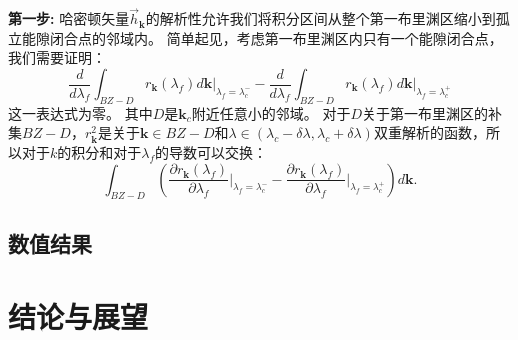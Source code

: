 			{\bf 第一步:}
			哈密顿矢量${\vec{h}}_{\mathbf{k}}$的解析性允许我们将积分区间从整个第一布里渊区缩小到孤立能隙闭合点的邻域内。
			简单起见，考虑第一布里渊区内只有一个能隙闭合点，我们需要证明：
			\begin{equation}
				\frac{d}{d\lambda_f} \int_{BZ-D} r_\mathbf{k}(\lambda_f) d\mathbf{k} \bigg|_{\lambda_f=\lambda_c^-} - \frac{d}{d\lambda_f} \int_{BZ-D} r_\mathbf{k}(\lambda_f) d\mathbf{k} \bigg|_{\lambda_f=\lambda_c^+}
			\end{equation}
			这一表达式为零。
			其中$D$是$\mathbf{k}_c$附近任意小的邻域。
			对于$D$关于第一布里渊区的补集$BZ-D$，$r_\mathbf{k}^2$是关于$\mathbf{k} \in BZ-D$和$\lambda \in (\lambda_c-\delta \lambda, \lambda_c+\delta \lambda)$双重解析的函数，所以对于$k$的积分和对于$\lambda_f$的导数可以交换：
			\begin{equation}
				\int_{BZ-D} \left(\frac{\partial r_\mathbf{k}(\lambda_f)}{\partial\lambda_f}  \bigg|_{\lambda_f = \lambda_c^-} - \frac{\partial r_\mathbf{k}(\lambda_f)}{\partial\lambda_f} \bigg|_{\lambda_f=\lambda_c^+}\right) d\mathbf{k}. 
			\end{equation}
			
		\subsection{数值结果}
		
				

	\section{结论与展望}